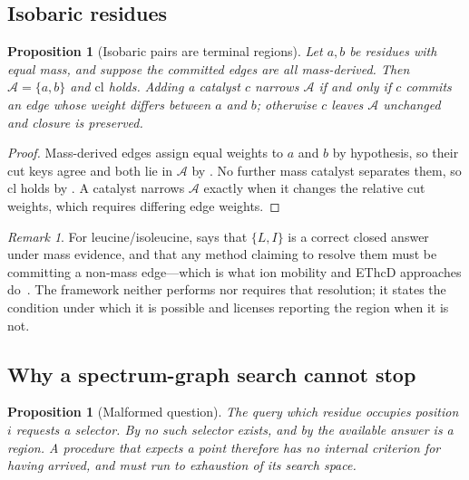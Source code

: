 \documentclass[11pt,a4paper]{article}
\newtheorem{proposition}[theorem]{Proposition}
\theoremstyle{definition}
\theoremstyle{remark}
\newtheorem{remark}[theorem]{Remark}
\newcommand{\clos}{\mathrm{cl}}
\newcommand{\amb}{\mathcal{A}}               %
\begin{document}
\subsection{Isobaric residues}

\begin{proposition}[Isobaric pairs are terminal regions]
\label{prop:isobaric}
Let $a,b$ be residues with equal mass, and suppose the committed edges
are all mass-derived. Then $\amb=\{a,b\}$ and $\clos$ holds. Adding a
catalyst $c$ narrows $\amb$ if and only if $c$ commits an edge whose
weight differs between $a$ and $b$; otherwise $c$ leaves $\amb$
unchanged and closure is preserved.
\end{proposition}

\begin{proof}
Mass-derived edges assign equal weights to $a$ and $b$ by hypothesis, so
their cut keys agree and both lie in $\amb$ by . No
further mass catalyst separates them, so $\clos$ holds by
. A catalyst narrows $\amb$ exactly when it changes the
relative cut weights, which requires differing edge weights.
\end{proof}

\begin{remark}
\label{rem:li}
For leucine/isoleucine,  says that $\{L,I\}$ is a
correct closed answer under mass evidence, and that any method claiming
to resolve them must be committing a non-mass edge---which is what ion
mobility and EThcD approaches
do~\citep{xiao2016distinguishing,zhokhov2017distinguishing}. The
framework neither performs nor requires that resolution; it states the
condition under which it is possible and licenses reporting the region
when it is not.
\end{remark}

\subsection{Why a spectrum-graph search cannot stop}

\begin{proposition}[Malformed question]
\label{prop:malformed}
The query \emph{which residue occupies position $i$} requests a selector.
By  no such selector exists, and by
 the available answer is a region. A procedure that
expects a point therefore has no internal criterion for having arrived,
and must run to exhaustion of its search space.
\end{proposition}
\end{document}
